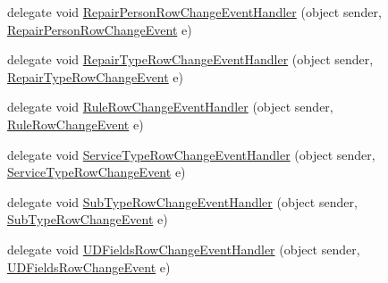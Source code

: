 \begin{DoxyCompactItemize}
\item 
delegate void \hyperlink{class_env_int_1_1_win32_1_1_field_tech_1_1_manager_1_1_data_sets_1_1_guide_ware_mobile_data_set_ab1d968fc848ee5de7b5a0eeeb994bdc7}{Repair\+Person\+Row\+Change\+Event\+Handler} (object sender, \hyperlink{class_env_int_1_1_win32_1_1_field_tech_1_1_manager_1_1_data_sets_1_1_guide_ware_mobile_data_set_9c921e67e64bbad224f4e7d364257dc3}{Repair\+Person\+Row\+Change\+Event} e)
\item 
delegate void \hyperlink{class_env_int_1_1_win32_1_1_field_tech_1_1_manager_1_1_data_sets_1_1_guide_ware_mobile_data_set_a9f766443fb197a07ea703f54c2a73232}{Repair\+Type\+Row\+Change\+Event\+Handler} (object sender, \hyperlink{class_env_int_1_1_win32_1_1_field_tech_1_1_manager_1_1_data_sets_1_1_guide_ware_mobile_data_set_86bb317b23e29e52c68c56fabaaadc6a}{Repair\+Type\+Row\+Change\+Event} e)
\item 
delegate void \hyperlink{class_env_int_1_1_win32_1_1_field_tech_1_1_manager_1_1_data_sets_1_1_guide_ware_mobile_data_set_af0c77bdb6e864f191e2dc93da00143ad}{Rule\+Row\+Change\+Event\+Handler} (object sender, \hyperlink{class_env_int_1_1_win32_1_1_field_tech_1_1_manager_1_1_data_sets_1_1_guide_ware_mobile_data_set_1_1_rule_row_change_event}{Rule\+Row\+Change\+Event} e)
\item 
delegate void \hyperlink{class_env_int_1_1_win32_1_1_field_tech_1_1_manager_1_1_data_sets_1_1_guide_ware_mobile_data_set_a8baede567c8baef2eb4b07c41d1b8a0b}{Service\+Type\+Row\+Change\+Event\+Handler} (object sender, \hyperlink{class_env_int_1_1_win32_1_1_field_tech_1_1_manager_1_1_data_sets_1_1_guide_ware_mobile_data_set_ce05812940788b7afd8b26922eaaec12}{Service\+Type\+Row\+Change\+Event} e)
\item 
delegate void \hyperlink{class_env_int_1_1_win32_1_1_field_tech_1_1_manager_1_1_data_sets_1_1_guide_ware_mobile_data_set_a1ba1e2549acaf1c86c08a0e9ca5e836f}{Sub\+Type\+Row\+Change\+Event\+Handler} (object sender, \hyperlink{class_env_int_1_1_win32_1_1_field_tech_1_1_manager_1_1_data_sets_1_1_guide_ware_mobile_data_set_1_1_sub_type_row_change_event}{Sub\+Type\+Row\+Change\+Event} e)
\item 
delegate void \hyperlink{class_env_int_1_1_win32_1_1_field_tech_1_1_manager_1_1_data_sets_1_1_guide_ware_mobile_data_set_a57a79313243866b76d7161614d0382a7}{U\+D\+Fields\+Row\+Change\+Event\+Handler} (object sender, \hyperlink{class_env_int_1_1_win32_1_1_field_tech_1_1_manager_1_1_data_sets_1_1_guide_ware_mobile_data_set_1_1_u_d_fields_row_change_event}{U\+D\+Fields\+Row\+Change\+Event} e)

\end{DoxyCompactItemize}
